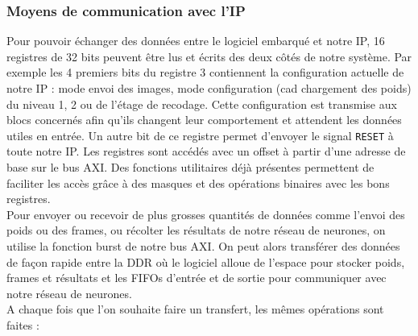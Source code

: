 \subsubsection{Moyens de communication avec l'IP}
Pour pouvoir échanger des données entre le logiciel embarqué et notre IP, 16
registres de 32 bits peuvent être lus et écrits des deux côtés de notre
système. Par exemple
les 4 premiers bits du registre 3 contiennent la configuration actuelle de notre
IP : mode envoi des images, mode configuration (cad chargement des poids) du
niveau 1, 2 ou de l'étage de recodage. Cette configuration est transmise
aux blocs concernés afin qu'ils changent leur comportement et attendent les
données utiles en entrée. Un autre bit de ce registre permet d'envoyer le
signal \texttt{RESET} à toute notre IP.
Les registres sont accédés avec un offset à partir d'une adresse de base
sur le bus AXI. Des fonctions utilitaires déjà présentes
permettent de faciliter les accès grâce à des masques et des opérations
binaires avec les bons registres. \\
Pour envoyer ou recevoir de plus grosses quantités de données comme l'envoi
des poids ou des frames, ou récolter les résultats de notre réseau de neurones,
on utilise la fonction burst de notre bus AXI. On peut alors transférer des
données de façon rapide entre la DDR où le logiciel alloue de l'espace
pour stocker poids, frames et résultats et les FIFOs d'entrée et de sortie pour
communiquer avec notre réseau de neurones. \\
A chaque fois que l'on souhaite faire un transfert, les mêmes opérations sont
faites :

